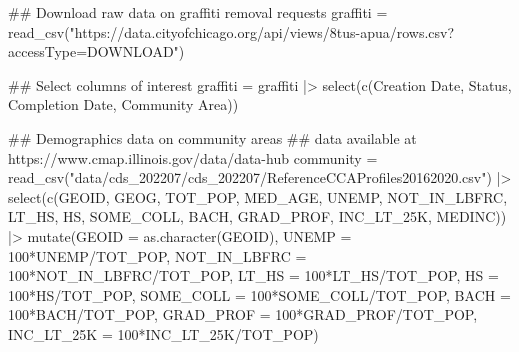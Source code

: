 \documentclass[
]{report}
\newenvironment{Shaded}{}{}
\newcommand{\AttributeTok}[1]{\textcolor[rgb]{0.65,0.15,0.64}{#1}}
\newcommand{\DecValTok}[1]{\textcolor[rgb]{0.60,0.41,0.00}{#1}}
\newcommand{\DocumentationTok}[1]{\textcolor[rgb]{0.89,0.34,0.29}{#1}}
\newcommand{\FunctionTok}[1]{\textcolor[rgb]{0.25,0.47,0.95}{#1}}
\newcommand{\NormalTok}[1]{\textcolor[rgb]{0.22,0.23,0.26}{#1}}
\newcommand{\OtherTok}[1]{\textcolor[rgb]{0.15,0.68,0.38}{#1}}
\newcommand{\SpecialCharTok}[1]{\textcolor[rgb]{0.00,0.52,0.74}{#1}}
\newcommand{\StringTok}[1]{\textcolor[rgb]{0.31,0.63,0.31}{#1}}
\begin{document}
\begin{Shaded}
\begin{Highlighting}[]
\DocumentationTok{\#\# Download raw data on graffiti removal requests}
\NormalTok{graffiti }\OtherTok{=} \FunctionTok{read\_csv}\NormalTok{(}\StringTok{"https://data.cityofchicago.org/api/views/8tus{-}apua/rows.csv?accessType=DOWNLOAD"}\NormalTok{)}

\DocumentationTok{\#\# Select columns of interest}
\NormalTok{graffiti }\OtherTok{=}\NormalTok{ graffiti }\SpecialCharTok{|\textgreater{}} 
  \FunctionTok{select}\NormalTok{(}\FunctionTok{c}\NormalTok{(}\StringTok{\textasciigrave{}}\AttributeTok{Creation Date}\StringTok{\textasciigrave{}}\NormalTok{, Status, }\StringTok{\textasciigrave{}}\AttributeTok{Completion Date}\StringTok{\textasciigrave{}}\NormalTok{, }\StringTok{\textasciigrave{}}\AttributeTok{Community Area}\StringTok{\textasciigrave{}}\NormalTok{))}

\DocumentationTok{\#\# Demographics data on community areas}
\DocumentationTok{\#\# data available at https://www.cmap.illinois.gov/data/data{-}hub}
\NormalTok{community }\OtherTok{=} \FunctionTok{read\_csv}\NormalTok{(}\StringTok{"data/cds\_202207/cds\_202207/ReferenceCCAProfiles20162020.csv"}\NormalTok{) }\SpecialCharTok{|\textgreater{}} 
  \FunctionTok{select}\NormalTok{(}\FunctionTok{c}\NormalTok{(GEOID, GEOG, TOT\_POP, MED\_AGE, UNEMP, NOT\_IN\_LBFRC, }
\NormalTok{           LT\_HS, HS, SOME\_COLL, BACH, GRAD\_PROF,}
\NormalTok{           INC\_LT\_25K, MEDINC)) }\SpecialCharTok{|\textgreater{}} 
  \FunctionTok{mutate}\NormalTok{(}\AttributeTok{GEOID =} \FunctionTok{as.character}\NormalTok{(GEOID),}
         \AttributeTok{UNEMP =} \DecValTok{100}\SpecialCharTok{*}\NormalTok{UNEMP}\SpecialCharTok{/}\NormalTok{TOT\_POP,}
         \AttributeTok{NOT\_IN\_LBFRC =} \DecValTok{100}\SpecialCharTok{*}\NormalTok{NOT\_IN\_LBFRC}\SpecialCharTok{/}\NormalTok{TOT\_POP,}
         \AttributeTok{LT\_HS =} \DecValTok{100}\SpecialCharTok{*}\NormalTok{LT\_HS}\SpecialCharTok{/}\NormalTok{TOT\_POP,}
         \AttributeTok{HS =} \DecValTok{100}\SpecialCharTok{*}\NormalTok{HS}\SpecialCharTok{/}\NormalTok{TOT\_POP,}
         \AttributeTok{SOME\_COLL =} \DecValTok{100}\SpecialCharTok{*}\NormalTok{SOME\_COLL}\SpecialCharTok{/}\NormalTok{TOT\_POP,}
         \AttributeTok{BACH =} \DecValTok{100}\SpecialCharTok{*}\NormalTok{BACH}\SpecialCharTok{/}\NormalTok{TOT\_POP,}
         \AttributeTok{GRAD\_PROF =} \DecValTok{100}\SpecialCharTok{*}\NormalTok{GRAD\_PROF}\SpecialCharTok{/}\NormalTok{TOT\_POP,}
         \AttributeTok{INC\_LT\_25K =} \DecValTok{100}\SpecialCharTok{*}\NormalTok{INC\_LT\_25K}\SpecialCharTok{/}\NormalTok{TOT\_POP)}


\end{Highlighting}
\end{Shaded}
\end{document}
